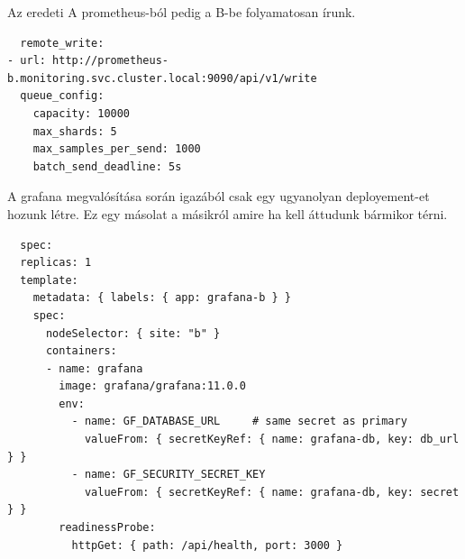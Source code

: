 Az eredeti A prometheus-ból pedig a B-be folyamatosan írunk.

\begin{lstlisting}
  remote_write:
- url: http://prometheus-b.monitoring.svc.cluster.local:9090/api/v1/write
  queue_config:
    capacity: 10000
    max_shards: 5
    max_samples_per_send: 1000
    batch_send_deadline: 5s
\end{lstlisting}

A grafana megvalósítása során igazából csak egy ugyanolyan deployement-et hozunk létre.
Ez egy másolat a másikról amire ha kell áttudunk bármikor térni.

\begin{lstlisting}
  spec:
  replicas: 1
  template:
    metadata: { labels: { app: grafana-b } }
    spec:
      nodeSelector: { site: "b" }
      containers:
      - name: grafana
        image: grafana/grafana:11.0.0
        env:
          - name: GF_DATABASE_URL     # same secret as primary
            valueFrom: { secretKeyRef: { name: grafana-db, key: db_url } }
          - name: GF_SECURITY_SECRET_KEY
            valueFrom: { secretKeyRef: { name: grafana-db, key: secret } }
        readinessProbe:
          httpGet: { path: /api/health, port: 3000 }
\end{lstlisting}